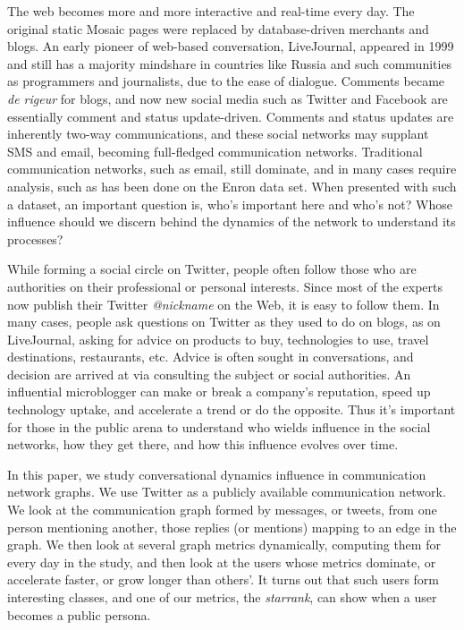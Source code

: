 \documentclass[10pt,oneside]{memoir}
\begin{document}
\begin{Spacing}{2}
\label{chapter:influence}


The web becomes more and more interactive and real-time every day.  The original static Mosaic pages were replaced by database-driven merchants and blogs.  An early pioneer of web-based conversation, LiveJournal, appeared in 1999 and still has a majority mindshare in countries like Russia and such communities as programmers and journalists, due to the ease of dialogue.  Comments became {\itshape de rigeur} for  blogs, and now new social media such as Twitter and Facebook are essentially comment and status update-driven.  Comments and status updates are inherently two-way communications, and these social networks may supplant SMS and email, becoming full-fledged communication networks.  Traditional communication networks, such as email, still dominate, and in many cases require analysis, such as has been done on the Enron data set.  When presented with such a dataset, an important question is, who's important here and who's not?  Whose influence should we discern behind the dynamics of the network to understand its processes?


While forming a social circle on Twitter, people often follow those who are authorities on their professional or personal interests.  Since most of the experts now publish their Twitter {\itshape @nickname} on the Web, it is easy to follow them.  In many cases, people ask questions on Twitter as they used to do on blogs, as on LiveJournal, asking for advice on products to buy, technologies to use, travel destinations, restaurants, etc.  Advice is often sought in conversations, and decision are arrived at via consulting the subject or social authorities.  An influential microblogger can make or break a company's reputation, speed up technology uptake, and accelerate a trend or do the opposite.  Thus it's important for those in the public arena to understand who wields influence in the social networks, how they get there, and how this influence evolves over time.


In this paper, we study conversational dynamics influence in communication network graphs.  We use Twitter as a publicly available communication network.  We look at the communication graph formed by messages, or tweets, from one person mentioning another, those replies (or mentions) mapping to an edge in the graph.  We then look at several graph metrics dynamically, computing them for every day in the study, and then look at the users whose metrics dominate, or accelerate faster, or grow longer than others'.  It turns out that such users form interesting classes, and one of our metrics, the {\itshape starrank}, can show when a user becomes a public persona.



\end{Spacing}
\end{document}
